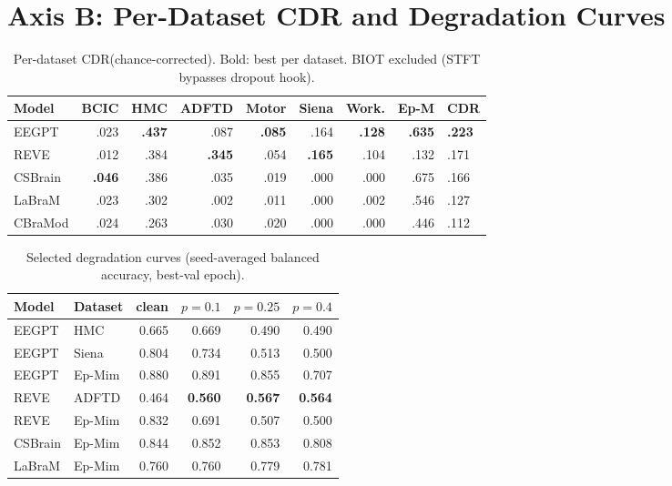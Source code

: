 \documentclass{article}
\newcommand{\cdr}{\textsc{CDR}\xspace}
\begin{document}
\FloatBarrier
\section{Axis B: Per-Dataset \cdr and Degradation Curves}
\label{app:axis_b_curves}

\begin{table}[h]
  \caption{Per-dataset \cdr (chance-corrected). Bold: best per dataset. BIOT excluded (STFT bypasses dropout hook).}
  \centering\small
  \begin{tabular}{lrrrrrrrl}
    \toprule
    Model & BCIC & HMC & ADFTD & Motor & Siena & Work. & Ep-M & CDR \\
    \midrule
    EEGPT & .023 & \textbf{.437} & .087 & \textbf{.085} & .164 & \textbf{.128} & \textbf{.635} & \textbf{.223} \\
    REVE & .012 & .384 & \textbf{.345} & .054 & \textbf{.165} & .104 & .132 & .171 \\
    CSBrain & \textbf{.046} & .386 & .035 & .019 & .000 & .000 & .675 & .166 \\
    LaBraM & .023 & .302 & .002 & .011 & .000 & .002 & .546 & .127 \\
    CBraMod & .024 & .263 & .030 & .020 & .000 & .000 & .446 & .112 \\
    \bottomrule
  \end{tabular}
\end{table}

\begin{table}[h]
  \caption{Selected degradation curves (seed-averaged balanced accuracy, best-val epoch).}
  \centering\small
  \begin{tabular}{llrrrr}
    \toprule
    Model & Dataset & clean & $p{=}0.1$ & $p{=}0.25$ & $p{=}0.4$ \\
    \midrule
    EEGPT & HMC & 0.665 & 0.669 & 0.490 & 0.490 \\
    EEGPT & Siena & 0.804 & 0.734 & 0.513 & 0.500 \\
    EEGPT & Ep-Mim & 0.880 & 0.891 & 0.855 & 0.707 \\
    REVE & ADFTD & 0.464 & \textbf{0.560} & \textbf{0.567} & \textbf{0.564} \\
    REVE & Ep-Mim & 0.832 & 0.691 & 0.507 & 0.500 \\
    CSBrain & Ep-Mim & 0.844 & 0.852 & 0.853 & 0.808 \\
    LaBraM & Ep-Mim & 0.760 & 0.760 & 0.779 & 0.781 \\
    \bottomrule
  \end{tabular}
\end{table}
\end{document}
